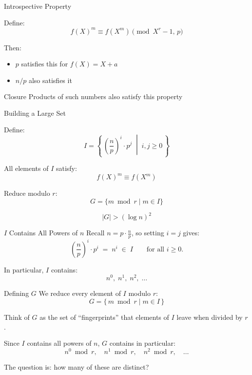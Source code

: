 \documentclass{beamer}
\begin{document}
\begin{frame}{Introspective Property}

Define:
\[
f(X)^m \equiv f(X^m) \pmod{X^r-1,\, p}
\]


Then:
\begin{itemize}
    \item $p$ satisfies this for $f(X)=X+a$
    \item $n/p$ also satisfies it
\end{itemize}


\begin{block}{Closure}
Products of such numbers also satisfy this property
\end{block}

\end{frame}


\begin{frame}{Building a Large Set}

Define:
\[
    I = \left\{\, \left(\frac{n}{p}\right)^{\!i} \cdot p^{j} \;\middle|\; i,j \ge 0 \,\right\}
\]


All elements of $I$ satisfy:
\[
f(X)^m \equiv f(X^m)
\]


Reduce modulo $r$:
\[
G = \{ m \bmod r \mid m \in I \}
\]


\[
|G| > (\log n)^2
\]

\end{frame}

\begin{frame}{$I$ Contains All Powers of $n$}
Recall $n = p \cdot \frac{n}{p}$, so setting $i = j$ gives:
\[
    \left(\frac{n}{p}\right)^{\!i} \cdot p^i \;=\; n^i \;\in\; I \qquad \text{for all } i \ge 0.
\]
\vspace{0.5em}

In particular, $I$ contains:
\[
    n^0,\; n^1,\; n^2,\; \ldots
\]
\end{frame}


\begin{frame}{Defining $G$}
We reduce every element of $I$ modulo $r$:
\[
    G = \{\, m \bmod r \mid m \in I \,\}
\]
\vspace{0.5em}

Think of $G$ as the set of ``fingerprints'' that elements of $I$
leave when divided by $r$.
\vspace{1em}

Since $I$ contains all powers of $n$, $G$ contains in particular:
\[
    n^0 \bmod r,\quad n^1 \bmod r,\quad n^2 \bmod r,\quad \ldots
\]
\vspace{0.5em}

The question is: how many of these are distinct?
\end{frame}
\end{document}

